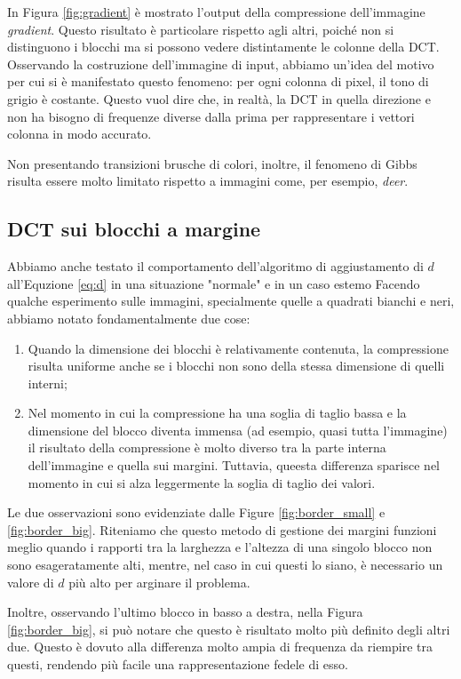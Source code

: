 In Figura \ref{fig:gradient} è mostrato l'output della compressione dell'immagine \textit{gradient}. Questo risultato è particolare rispetto agli altri, poiché non si distinguono i blocchi ma si possono vedere distintamente le colonne della DCT. Osservando la costruzione dell'immagine di input, abbiamo un'idea del motivo per cui si è manifestato questo fenomeno: per ogni colonna di pixel, il tono di grigio è costante. Questo vuol dire che, in realtà, la DCT in quella direzione e non ha bisogno di frequenze diverse dalla prima per rappresentare i vettori colonna in modo accurato.

Non presentando transizioni brusche di colori, inoltre, il fenomeno di Gibbs risulta essere molto limitato rispetto a immagini come, per esempio, \textit{deer}.



\subsection{DCT sui blocchi a margine}
Abbiamo anche testato il comportamento dell'algoritmo di aggiustamento di $d$ all'Equzione \ref{eq:d} in una situazione "normale" e in un caso estemo
Facendo qualche esperimento sulle immagini, specialmente quelle a quadrati bianchi e neri, abbiamo notato fondamentalmente due cose:
\begin{enumerate}
	\item Quando la dimensione dei blocchi è relativamente contenuta, la compressione risulta uniforme anche se i blocchi non sono della stessa dimensione di quelli interni;
	\item Nel momento in cui la compressione ha una soglia di taglio bassa e la dimensione del blocco diventa immensa (ad esempio, quasi tutta l'immagine) il risultato della compressione è molto diverso tra la parte interna dell'immagine e quella sui margini. Tuttavia, queesta differenza sparisce nel momento in cui si alza leggermente la soglia di taglio dei valori.
\end{enumerate}
Le due osservazioni sono evidenziate dalle Figure \ref{fig:border_small} e \ref{fig:border_big}. Riteniamo che questo metodo di gestione dei margini funzioni meglio quando i rapporti tra la larghezza e l'altezza di una singolo blocco non sono esageratamente alti,  mentre, nel caso in cui questi lo siano, è necessario un valore di $d$ più alto per arginare il problema. 

Inoltre, osservando l'ultimo blocco in basso a destra, nella Figura \ref{fig:border_big}, si può notare che questo è risultato molto più definito degli altri due. Questo è dovuto alla differenza molto ampia di frequenza da riempire tra questi, rendendo più facile una rappresentazione fedele di esso.



